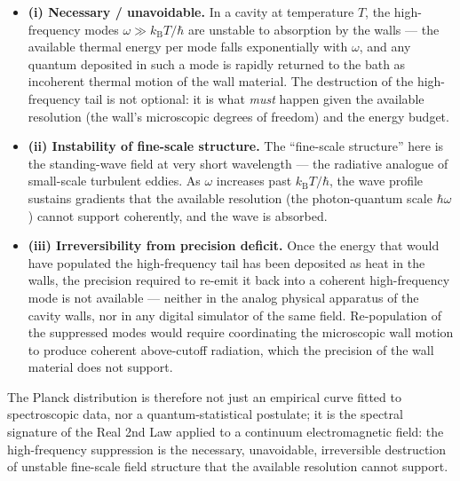\begin{itemize}
\item \textbf{(i) Necessary / unavoidable.}  In a cavity at
temperature $T$, the high-frequency modes $\omega \gg k_{\mathrm{B}}T/\hbar$
are unstable to absorption by the walls --- the available thermal
energy per mode falls exponentially with $\omega$, and any quantum
deposited in such a mode is rapidly returned to the bath as
incoherent thermal motion of the wall material. The destruction of
the high-frequency tail is not optional: it is what \emph{must}
happen given the available resolution (the wall's microscopic
degrees of freedom) and the energy budget.

\item \textbf{(ii) Instability of fine-scale structure.}  The
``fine-scale structure'' here is the standing-wave field at very
short wavelength --- the radiative analogue of small-scale turbulent
eddies. As $\omega$ increases past $k_{\mathrm{B}}T/\hbar$, the wave
profile sustains gradients that the available resolution (the
photon-quantum scale $\hbar\omega$) cannot support coherently, and
the wave is absorbed.

\item \textbf{(iii) Irreversibility from precision deficit.}  Once
the energy that would have populated the high-frequency tail has
been deposited as heat in the walls, the precision required to
re-emit it back into a coherent high-frequency mode is not
available --- neither in the analog physical apparatus of the cavity
walls, nor in any digital simulator of the same field.
Re-population of the suppressed modes would require coordinating
the microscopic wall motion to produce coherent above-cutoff
radiation, which the precision of the wall material does not
support.
\end{itemize}

The Planck distribution is therefore not just an empirical curve
fitted to spectroscopic data, nor a quantum-statistical postulate; it
is the spectral signature of the Real 2nd Law applied to a continuum
electromagnetic field: the high-frequency suppression is the
necessary, unavoidable, irreversible destruction of unstable
fine-scale field structure that the available resolution cannot
support.
